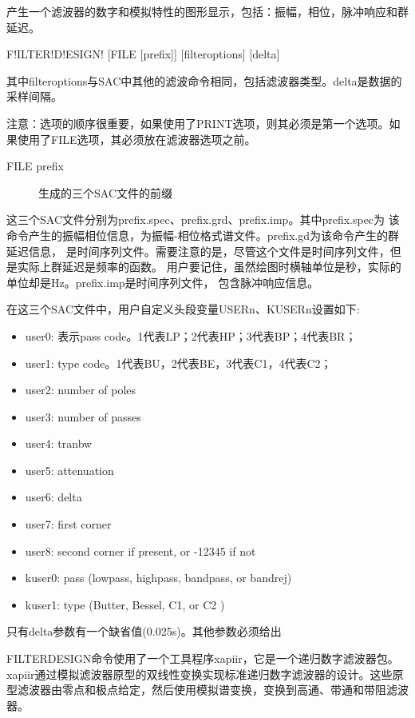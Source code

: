 \label{cmd:filterdesign}

产生一个滤波器的数字和模拟特性的图形显示，包括：振幅，相位，脉冲响应和群延迟。

\begin{SACSTX}
F!ILTER!D!ESIGN! [FILE [prefix]] [filteroptions] [delta]
\end{SACSTX}
其中filteroptions与SAC中其他的滤波命令相同，包括滤波器类型。delta是数据的采样间隔。

注意：选项的顺序很重要，如果使用了PRINT选项，则其必须是第一个选项。如果使用了FILE选项，其必须放在滤波器选项之前。

\begin{description}
\item [FILE prefix] 生成的三个SAC文件的前缀
\end{description}

这三个SAC文件分别为prefix.spec、prefix.grd、prefix.imp。其中prefix.spec为
该命令产生的振幅相位信息，为振幅-相位格式谱文件。prefix.gd为该命令产生的群延迟信息，
是时间序列文件。需要注意的是，尽管这个文件是时间序列文件，但是实际上群延迟是频率的函数。
用户要记住，虽然绘图时横轴单位是秒，实际的单位却是Hz。prefix.imp是时间序列文件，
包含脉冲响应信息。

在这三个SAC文件中，用户自定义头段变量USERn、KUSERn设置如下:
\begin{itemize}
\item user0: 表示pass code。1代表LP；2代表HP；3代表BP；4代表BR；
\item user1: type code。1代表BU，2代表BE，3代表C1，4代表C2；
\item user2:  number of poles
\item user3:  number of passes
\item user4:  tranbw
\item user5:  attenuation
\item user6:  delta
\item user7:  first corner
\item user8:  second corner if present, or -12345 if not
\item kuser0: pass (lowpass, highpass, bandpass, or bandrej)
\item kuser1: type (Butter, Bessel, C1, or C2 )
\end{itemize}

只有delta参数有一个缺省值(0.025s)。其他参数必须给出

FILTERDESIGN命令使用了一个工具程序xapiir，它是一个递归数字滤波器包。xapiir通过模拟滤波器原型的双线性变换实现标准递归数字滤波器的设计。这些原型滤波器由零点和极点给定，然后使用模拟谱变换，变换到高通、带通和带阻滤波器。

